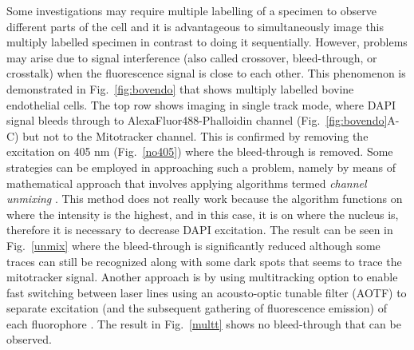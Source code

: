 Some investigations may require multiple labelling of a specimen to observe different parts of the cell and it is advantageous to simultaneously image this multiply labelled specimen in contrast to doing it sequentially. 
However, problems may arise due to signal interference (also called crossover, bleed-through, or crosstalk) when the fluorescence signal is close to each other. 
This phenomenon is demonstrated in Fig.~\ref{fig:bovendo} that shows multiply labelled bovine endothelial cells. 
The top row shows imaging in single track mode, where DAPI signal bleeds through to AlexaFluor488-Phalloidin channel (Fig.~\ref{fig:bovendo}A-C) but not to the Mitotracker channel. 
This is confirmed by removing the excitation on 405 nm (Fig.~\ref{no405}) where the bleed-through is removed. 
Some strategies can be employed in approaching such a problem, namely by means of mathematical approach that involves applying algorithms termed \textit{channel unmixing} \cite{NikonMicro}\cite{Lect11}. 
This method does not really work because the algorithm functions on where the intensity is the highest, and in this case, it is on where the nucleus is, therefore it is necessary to decrease DAPI excitation. 
The result can be seen in Fig.~\ref{unmix} where the bleed-through is significantly reduced although some traces can still be recognized along with some dark spots that seems to trace the mitotracker signal. 
Another approach is by using multitracking option to enable fast switching between laser lines using an acousto-optic tunable filter (AOTF) to separate excitation (and the subsequent gathering of fluorescence emission) of each fluorophore \cite{ZeissCamp3}. 
The result in Fig.~\ref{multt} shows no bleed-through that can be observed.

